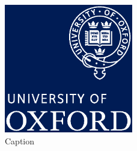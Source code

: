 \begin{figure}
    \centering
    \includegraphics[width=0.5\textwidth]{oxlogo.eps}
    \caption{Caption}
    \label{fig:my_label}
\end{figure}